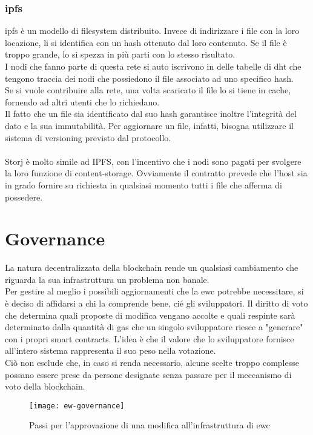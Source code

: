 \subsubsection{\gls{ipfs}}
\gls{ipfs} è un modello di filesystem distribuito.
Invece di indirizzare i file con la loro locazione, li si identifica con un hash ottenuto dal loro contenuto.
Se il file è troppo grande, lo si spezza in più parti con lo stesso risultato. \\
I nodi che fanno parte di questa rete si auto iscrivono in delle tabelle di \gls{dht} che tengono traccia dei nodi che possiedono il file associato ad uno specifico hash. \\
Se si vuole contribuire alla rete, una volta scaricato il file lo si tiene in cache, fornendo ad altri utenti che lo richiedano. \\
Il fatto che un file sia identificato dal suo hash garantisce inoltre l'integrità del dato e la sua immutabilità.
Per aggiornare un file, infatti, bisogna utilizzare il sistema di versioning previsto dal protocollo. \\ \\
Storj è molto simile ad IPFS, con l'incentivo che i nodi sono pagati per svolgere la loro funzione di content-storage.
Ovviamente il contratto prevede che l'host sia in grado fornire su richiesta in qualsiasi momento tutti i file che afferma di possedere.


\section{Governance}
La natura decentralizzata della blockchain rende un qualsiasi cambiamento che riguarda la sua infrastruttura un problema non banale. \\
Per gestire al meglio i possibili aggiornamenti che la \gls{ewc} potrebbe necessitare, si è deciso di affidarsi a chi la comprende bene, cié gli sviluppatori.
Il diritto di voto che determina quali proposte di modifica vengano accolte e quali respinte sarà determinato dalla quantità di gas che un singolo sviluppatore riesce a "generare" con i propri smart contracts.
L'idea è che il valore che lo sviluppatore fornisce all'intero sistema rappresenta il suo peso nella votazione. \cite{wiki:ew-governance} \\
Ciò non esclude che, in caso si renda necessario, alcune scelte troppo complesse possano essere prese da persone designate senza passare per il meccanismo di voto della blockchain.

\begin{figure}[h]
    \texttt{[image: ew-governance]}
    \centering
    \caption{Passi per l'approvazione di una modifica all'infrastruttura di \gls{ewc} \cite{img:ew-governance}}
    \label{lab:ew-governance}
\end{figure}


